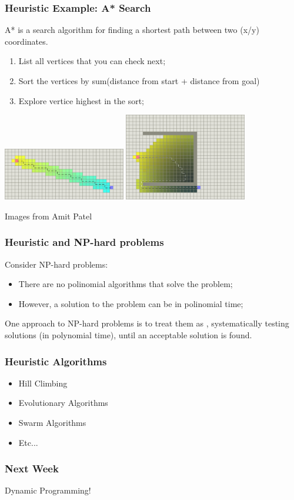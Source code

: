\documentclass{beamer}
\begin{document}
\begin{frame}
  \frametitle{Heuristic Example: A* Search}

  A* is a search algorithm for finding a shortest path between two
  (x/y) coordinates.

  {\small
  \begin{enumerate}
  \item List all vertices that you can check next;
  \item Sort the vertices by sum(distance from start + distance from goal)
  \item Explore vertice highest in the sort;
  \end{enumerate}
  }

  \includegraphics[width=0.4\textwidth]{../img/astar2_amitpatel}\hfill
  \includegraphics[width=0.4\textwidth]{../img/astar_amitpatel}

  \hfill{\tiny Images from Amit Patel}

\end{frame}

\begin{frame}
  \frametitle{Heuristic and NP-hard problems}

  Consider NP-hard problems:
  \begin{itemize}
  \item There are no polinomial algorithms that solve the problem;
  \item However, a solution to the problem can be 
    in polinomial time;
  \end{itemize}

  \bigskip

  One approach to NP-hard problems is to treat them as
  , systematically testing solutions
  (in polynomial time), until an acceptable solution is found.
\end{frame}

\begin{frame}
  \frametitle{Heuristic Algorithms}
  \begin{itemize}
  \item Hill Climbing
  \item Evolutionary Algorithms
  \item Swarm Algorithms
  \item Etc...
  \end{itemize}
\end{frame}

\begin{frame}
  \frametitle{Next Week}
  \begin{center}
    Dynamic Programming!
  \end{center}
\end{frame}
\end{document}

